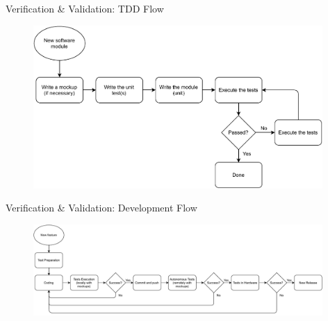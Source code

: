 \begin{frame}{Verification \& Validation: TDD Flow}

    \begin{figure}[!ht]
        \begin{center}
            \includegraphics[width=11cm]{figures/tdd-flow.pdf}
        \end{center}
    \end{figure}

\end{frame}

\begin{frame}{Verification \& Validation: Development Flow}

    \begin{figure}[!ht]
        \begin{center}
            \includegraphics[width=11cm]{figures/dev-flow.pdf}
        \end{center}
    \end{figure}

\end{frame}